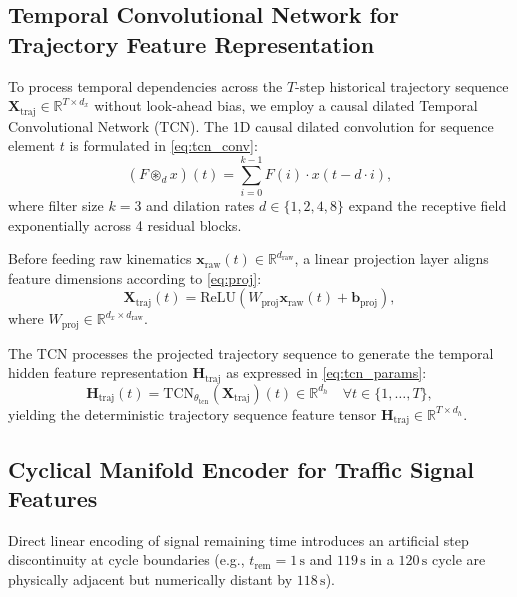 \documentclass[journal]{IEEEtran}
\begin{document}
\subsection{Temporal Convolutional Network for Trajectory Feature Representation}\label{sec:vtcn}
To process temporal dependencies across the $T$-step historical trajectory sequence $\mathbf{X}_{\text{traj}} \in \mathbb{R}^{T \times d_x}$ without look-ahead bias, we employ a causal dilated Temporal Convolutional Network (TCN). The 1D causal dilated convolution for sequence element $t$ is formulated in \eqref{eq:tcn_conv}:
\begin{equation}
(F \circledast_d x)(t) = \sum_{i=0}^{k-1} F(i) \cdot x(t - d \cdot i),
\label{eq:tcn_conv}
\end{equation}
where filter size $k=3$ and dilation rates $d \in \{1, 2, 4, 8\}$ expand the receptive field exponentially across 4 residual blocks.

Before feeding raw kinematics $\mathbf{x}_{\text{raw}}(t) \in \mathbb{R}^{d_{\text{raw}}}$, a linear projection layer aligns feature dimensions according to \eqref{eq:proj}:
\begin{equation}
\mathbf{X}_{\text{traj}}(t) = \text{ReLU}\left(W_{\text{proj}} \mathbf{x}_{\text{raw}}(t) + \mathbf{b}_{\text{proj}}\right),
\label{eq:proj}
\end{equation}
where $W_{\text{proj}} \in \mathbb{R}^{d_x \times d_{\text{raw}}}$.

The TCN processes the projected trajectory sequence to generate the temporal hidden feature representation $\mathbf{H}_{\text{traj}}$ as expressed in \eqref{eq:tcn_params}:
\begin{equation}
\mathbf{H}_{\text{traj}}(t) = \text{TCN}_{\theta_{\text{tcn}}}(\mathbf{X}_{\text{traj}})(t) \in \mathbb{R}^{d_h} \quad \forall t \in \{1, \ldots, T\},
\label{eq:tcn_params}
\end{equation}
yielding the deterministic trajectory sequence feature tensor $\mathbf{H}_{\text{traj}} \in \mathbb{R}^{T \times d_h}$.

\subsection{Cyclical Manifold Encoder for Traffic Signal Features}\label{sec:cyclical}
Direct linear encoding of signal remaining time introduces an artificial step discontinuity at cycle boundaries (e.g., $t_{\text{rem}} = 1\,\text{s}$ and $119\,\text{s}$ in a $120\,\text{s}$ cycle are physically adjacent but numerically distant by $118\,\text{s}$).
\end{document}
